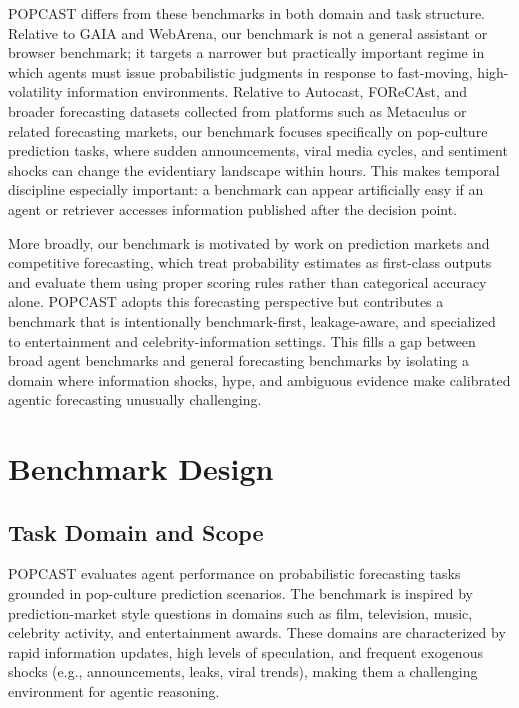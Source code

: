 \documentclass{article} %
\newcommand{\benchmarkname}{POPCAST}
\begin{document}
\benchmarkname{} differs from these benchmarks in both domain and task structure. Relative to GAIA and WebArena, our benchmark is not a general assistant or browser benchmark; it targets a narrower but practically important regime in which agents must issue probabilistic judgments in response to fast-moving, high-volatility information environments. Relative to Autocast, FOReCAst, and broader forecasting datasets collected from platforms such as Metaculus or related forecasting markets, our benchmark focuses specifically on pop-culture prediction tasks, where sudden announcements, viral media cycles, and sentiment shocks can change the evidentiary landscape within hours. This makes temporal discipline especially important: a benchmark can appear artificially easy if an agent or retriever accesses information published after the decision point.

More broadly, our benchmark is motivated by work on prediction markets and competitive forecasting, which treat probability estimates as first-class outputs and evaluate them using proper scoring rules rather than categorical accuracy alone. \benchmarkname{} adopts this forecasting perspective but contributes a benchmark that is intentionally benchmark-first, leakage-aware, and specialized to entertainment and celebrity-information settings. This fills a gap between broad agent benchmarks and general forecasting benchmarks by isolating a domain where information shocks, hype, and ambiguous evidence make calibrated agentic forecasting unusually challenging.

\section{Benchmark Design}
\label{sec:design}

\subsection{Task Domain and Scope}

\benchmarkname{} evaluates agent performance on probabilistic forecasting tasks grounded in pop-culture prediction scenarios. The benchmark is inspired by prediction-market style questions in domains such as film, television, music, celebrity activity, and entertainment awards. These domains are characterized by rapid information updates, high levels of speculation, and frequent exogenous shocks (e.g., announcements, leaks, viral trends), making them a challenging environment for agentic reasoning.
\end{document}
